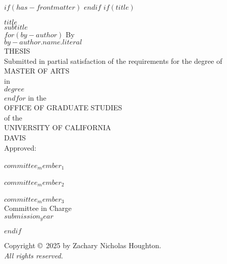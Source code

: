 $if(has-frontmatter)$
\frontmatter
$endif$
$if(title)$
\cleardoublepage
\thispagestyle{plain}
\begin{center}
   \null\vfill
   \textbf{%
      $title$\\
	  $subtitle$
   }%
   \\
$for(by-author)$
   \bigskip
   By \\
   \bigskip
   {$by-author.name.literal$}
\\   
   THESIS \\
   \bigskip
   Submitted in partial satisfaction of the requirements for the
   degree of \\
   \bigskip
   MASTER OF ARTS \\
   \bigskip
   in \\
   \bigskip
   {$degree$} \\ 
   $endfor$
   \bigskip
   in the \\
   \bigskip
   OFFICE OF GRADUATE STUDIES \\
   \bigskip        
   of the \\
   \bigskip
   UNIVERSITY OF CALIFORNIA \\
   \bigskip
   DAVIS \\
   \bigskip
   Approved: \\
   \bigskip
   \bigskip
   \makebox[3in]{\hrulefill} \\
   $committee_member_1$ \\
   \bigskip
   \bigskip
   \makebox[3in]{\hrulefill} \\
   $committee_member_2$ \\
   \bigskip
   \bigskip
   \makebox[3in]{\hrulefill} \\
   $committee_member_3$ \\
   \bigskip
   Committee in Charge \\
   \bigskip
   $submission_year$ \\
   \vfill
\end{center}
$endif$


\newpage
{}
\setcounter{savedpage}{\value{page}}

\thispagestyle{empty}
\begin{titlepage}
\begin{center}
  Copyright \copyright\ 2025 by Zachary Nicholas Houghton. \\
  \textit{All rights reserved.}
\end{center}
\end{titlepage}

\setcounter{page}{\value{savedpage}} %
\clearpage

